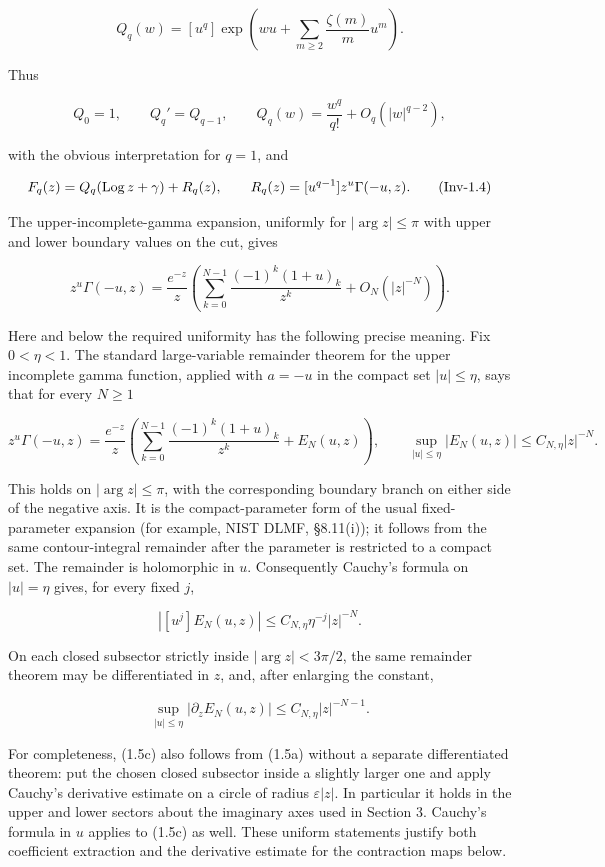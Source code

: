 \[
 Q_q(w)=[u^q]\exp\!\left(
 wu+\sum_{m\geq2}\frac{\zeta(m)}m u^m\right).
\tag{Inv-1.2}
\]

Thus

\[
 Q_0=1,\qquad Q_q'=Q_{q-1},\qquad
 Q_q(w)=\frac{w^q}{q!}+O_q(|w|^{q-2}),
\tag{Inv-1.3}
\]

with the obvious interpretation for \(q=1\), and

\[
 F_q(z)=Q_q(\operatorname{Log} z+\gamma)+R_q(z),\qquad
 R_q(z)=[u^{q-1}]z^u\Gamma(-u,z).
\tag{Inv-1.4}
\]

The upper-incomplete-gamma expansion, uniformly for \(|\arg z|\leq\pi\)
with upper and lower boundary values on the cut, gives

\[
 z^u\Gamma(-u,z)
 =\frac{e^{-z}}z\left(
 \sum_{k=0}^{N-1}\frac{(-1)^k(1+u)_k}{z^k}
 +O_N(|z|^{-N})\right).
\tag{Inv-1.5}
\]

Here and below the required uniformity has the following precise meaning.
Fix \(0<\eta<1\). The standard large-variable remainder theorem for the
upper incomplete gamma function, applied with \(a=-u\) in the compact set
\(|u|\leq\eta\), says that for every \(N\geq1\)

\[
 z^u\Gamma(-u,z)=\frac{e^{-z}}z
 \left(\sum_{k=0}^{N-1}\frac{(-1)^k(1+u)_k}{z^k}
       +E_N(u,z)\right),
 \qquad
 \sup_{|u|\leq\eta}|E_N(u,z)|\leq C_{N,\eta}|z|^{-N}.
\tag{Inv-1.5a}
\]

This holds on \(|\arg z|\leq\pi\), with the corresponding boundary branch
on either side of the negative axis. It is the compact-parameter form of
the usual fixed-parameter expansion (for example, NIST DLMF, \S8.11(i)); it
follows from the same contour-integral remainder after the parameter is
restricted to a compact set. The remainder is holomorphic in \(u\).
Consequently Cauchy's formula on \(|u|=\eta\) gives, for every fixed \(j\),

\[
 |[u^j]E_N(u,z)|\leq C_{N,\eta}\eta^{-j}|z|^{-N}.
\tag{Inv-1.5b}
\]

On each closed subsector strictly inside \(|\arg z|<3\pi/2\), the same
remainder theorem may be differentiated in \(z\), and, after enlarging the
constant,

\[
 \sup_{|u|\leq\eta}|\partial_zE_N(u,z)|
 \leq C_{N,\eta}|z|^{-N-1}.
\tag{Inv-1.5c}
\]

For completeness, (1.5c) also follows from (1.5a) without a separate
differentiated theorem: put the chosen closed subsector inside a slightly
larger one and apply Cauchy's derivative estimate on a circle of radius
\(\varepsilon|z|\). In particular it holds in the upper and lower sectors
about the imaginary axes used in Section 3. Cauchy's formula in \(u\)
applies to (1.5c) as well. These uniform statements justify both
coefficient extraction and the derivative estimate for the contraction maps
below.

